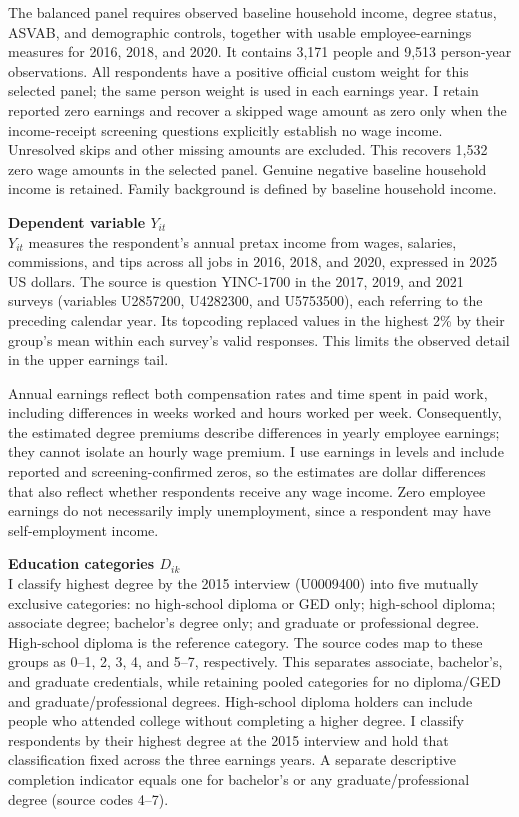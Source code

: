 \documentclass[12pt,letterpaper]{article}
\begin{document}
The balanced panel requires observed baseline household income, degree status,
ASVAB, and demographic controls, together with usable employee-earnings measures
for 2016, 2018, and 2020. It contains 3,171 people and 9,513 person-year observations.
All respondents have a positive official custom weight for this selected panel;
the same person weight is used in each earnings year. I retain reported zero earnings and
recover a skipped wage amount as zero only when the income-receipt screening
questions explicitly establish no wage income. Unresolved skips and other missing
amounts are excluded. This recovers 1,532 zero wage amounts in the selected panel.
Genuine negative baseline household income is retained. Family background is
defined by baseline household income.\newline

\textbf{Dependent variable $Y_{it}$}\\
$Y_{it}$ measures the respondent's annual pretax income from wages, salaries,
commissions, and tips across all jobs in 2016, 2018, and 2020, expressed in 2025
US dollars. The source is question YINC-1700 in the 2017, 2019, and 2021 surveys
(variables U2857200, U4282300, and U5753500), each referring to the preceding
calendar year. Its topcoding replaced values in the highest 2\% by 
their group's mean within each survey's valid responses. This limits the
 observed detail in the upper earnings tail.\newline

Annual earnings reflect both compensation rates and time spent in paid work,
including differences in weeks worked and hours worked per week. Consequently,
the estimated degree premiums describe differences in yearly employee earnings;
they cannot isolate an hourly wage premium. I use earnings in levels and include
reported and screening-confirmed zeros, so the estimates are dollar differences
that also reflect whether respondents receive any wage income. Zero employee earnings
do not necessarily imply unemployment, since a respondent may have self-employment
income.\newline

\textbf{Education categories $D_{ik}$}\\
I classify highest degree by the 2015 interview (U0009400) into five mutually exclusive
categories: no high-school diploma or GED only; high-school diploma; associate
degree; bachelor's degree only; and graduate or professional degree. High-school
diploma is the reference category. The source codes map to these groups as
0--1, 2, 3, 4, and 5--7, respectively. This separates associate, bachelor's, and
graduate credentials, while retaining pooled categories for no diploma/GED and
graduate/professional degrees. High-school diploma holders can include people who
attended college without completing a higher degree. I classify respondents by their
highest degree at the 2015 interview and hold that classification fixed across the
three earnings years. A separate descriptive completion indicator
equals one for bachelor's or any graduate/professional degree (source codes 4--7).\newline
\end{document}
